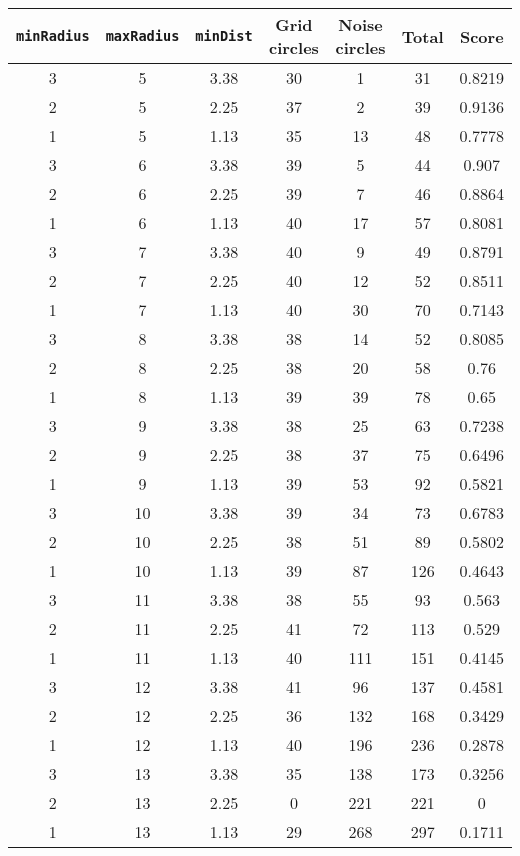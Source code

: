 \documentclass[letterpaper, 12pt]{article}
\begin{document}
\begin{longtable}{|c|c|c|c|c|c|c|}
\hline
\textbf{\texttt{minRadius}} & \textbf{\texttt{maxRadius}} & \textbf{\texttt{minDist}} & \textbf{Grid circles} & \textbf{Noise circles} & \textbf{Total} & \textbf{Score} \\
\hline
3 & 5 & 3.38 & 30 & 1 & 31 & 0.8219 \\
\hline
2 & 5 & 2.25 & 37 & 2 & 39 & 0.9136 \\
\hline
1 & 5 & 1.13 & 35 & 13 & 48 & 0.7778 \\
\hline
3 & 6 & 3.38 & 39 & 5 & 44 & 0.907 \\
\hline
2 & 6 & 2.25 & 39 & 7 & 46 & 0.8864 \\
\hline
1 & 6 & 1.13 & 40 & 17 & 57 & 0.8081 \\
\hline
3 & 7 & 3.38 & 40 & 9 & 49 & 0.8791 \\
\hline
2 & 7 & 2.25 & 40 & 12 & 52 & 0.8511 \\
\hline
1 & 7 & 1.13 & 40 & 30 & 70 & 0.7143 \\
\hline
3 & 8 & 3.38 & 38 & 14 & 52 & 0.8085 \\
\hline
2 & 8 & 2.25 & 38 & 20 & 58 & 0.76 \\
\hline
1 & 8 & 1.13 & 39 & 39 & 78 & 0.65 \\
\hline
3 & 9 & 3.38 & 38 & 25 & 63 & 0.7238 \\
\hline
2 & 9 & 2.25 & 38 & 37 & 75 & 0.6496 \\
\hline
1 & 9 & 1.13 & 39 & 53 & 92 & 0.5821 \\
\hline
3 & 10 & 3.38 & 39 & 34 & 73 & 0.6783 \\
\hline
2 & 10 & 2.25 & 38 & 51 & 89 & 0.5802 \\
\hline
1 & 10 & 1.13 & 39 & 87 & 126 & 0.4643 \\
\hline
3 & 11 & 3.38 & 38 & 55 & 93 & 0.563 \\
\hline
2 & 11 & 2.25 & 41 & 72 & 113 & 0.529 \\
\hline
1 & 11 & 1.13 & 40 & 111 & 151 & 0.4145 \\
\hline
3 & 12 & 3.38 & 41 & 96 & 137 & 0.4581 \\
\hline
2 & 12 & 2.25 & 36 & 132 & 168 & 0.3429 \\
\hline
1 & 12 & 1.13 & 40 & 196 & 236 & 0.2878 \\
\hline
3 & 13 & 3.38 & 35 & 138 & 173 & 0.3256 \\
\hline
2 & 13 & 2.25 & 0 & 221 & 221 & 0 \\
\hline
1 & 13 & 1.13 & 29 & 268 & 297 & 0.1711 \\

\end{longtable}
\end{document}
